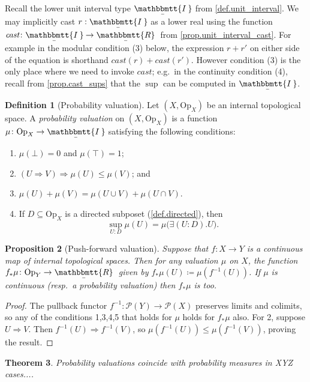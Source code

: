 \documentclass[11pt, oneside, article]{memoir}
\theoremstyle{plain}
\newtheorem{theorem}{Theorem}[chapter] %
\newtheorem{proposition}[theorem]{Proposition}
\theoremstyle{definition}
\newtheorem{definition}[theorem]{Definition}
\theoremstyle{remark}
\renewcommand{\ss}{\subseteq}
\newcommand{\Set}[1]{\mathrm{#1}}
\newcommand{\ubar}[1]{\underaccent{\bar}{#1}}
\newcommand{\internal}[1]{\raisebox{-.03ex}{$\mathbbmtt{#1}$}}
\newcommand{\hs}{\hspace{1.1pt}}
\newcommand{\trr}{\internal{R}\hs}
\newcommand{\tii}{\ubar{\internal{I\hs\hs}}\!\hs}
\newcommand{\tlrr}{\ubar{\trr}\hs}
\newcommand{\cast}{\textit{cast}}
\newcommand{\pow}{\mathcal{P}}
\newcommand{\Op}{\Set{Op}}
\newcommand{\inv}{^{-1}}
\newcommand{\imp}{\Rightarrow}
\begin{document}
Recall the lower unit interval type $\tii$ from \cref{def.unit_interval}. We may implicitly cast $r:\tii$ as a lower real using the function $\cast\colon\tii\to\tlrr$ from \cref{prop.unit_interval_cast}. For example in the modular condition (3) below, the expression $r+r'$ on either side of the equation is shorthand $\cast(r)+\cast(r')$. However condition (3) is the only place where we need to invoke $\cast$; e.g.\ in the continuity condition (4), recall from \cref{prop.cast_sups} that the $\sup$ can be computed in $\tii$.

\begin{definition}[Probability valuation]
Let $(X,\Op_X)$ be an internal topological space. A \emph{probability valuation} on $(X,\Op_X)$ is a function $\mu\colon\Op_X\to\tii$ satisfying the following conditions:
\begin{enumerate}
	\item $\mu(\bot)=0$ and $\mu(\top)=1$;
	\item $(U\imp V)\imp\mu(U)\leq\mu(V)$; and
	\item $\mu(U)+\mu(V)=\mu(U\cup V)+\mu(U\cap V)$.
	\item If $D\ss\Op_X$ is a directed subposet (\cref{def.directed}), then
	\begin{equation}\label{eqn.scott_continuity}
	\sup_{U: D}\mu(U)=\mu\big(\exists(U:D).U\big).
	\end{equation}
\end{enumerate}
\end{definition}


\begin{proposition}[Push-forward valuation]\label{prop.pushforward}
Suppose that $f\colon X\to Y$ is a continuous map of internal topological spaces. Then for any valuation $\mu$ on $X$, the function $f_*\mu\colon\Op_Y\to\tlrr$ given by $f_*\mu(U)\coloneqq\mu(f\inv(U))$. If $\mu$ is continuous (resp.\ a probability valuation) then $f_*\mu$ is too.
\end{proposition}
\begin{proof}
The pullback functor $f\inv\colon\pow(Y)\to\pow(X)$ preserves limits and colimits, so any of the conditions 1,3,4,5 that holds for $\mu$ holds for $f_*\mu$ also. For 2, suppose $U\imp V$. Then $f\inv(U)\imp f\inv(V)$, so $\mu(f\inv(U))\leq\mu(f\inv(V))$, proving the result.
\end{proof}

\begin{theorem}
Probability valuations coincide with probability measures in XYZ cases....
\end{theorem}
\end{document}

